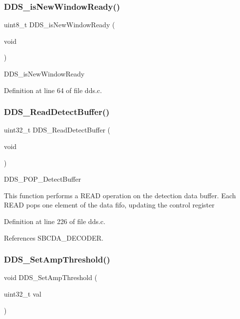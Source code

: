 \subsubsection{\texorpdfstring{D\+D\+S\+\_\+is\+New\+Window\+Ready()}{DDS\_isNewWindowReady()}}
{\footnotesize\ttfamily uint8\+\_\+t D\+D\+S\+\_\+is\+New\+Window\+Ready (\begin{DoxyParamCaption}\item[{void}]{ }\end{DoxyParamCaption})}

D\+D\+S\+\_\+is\+New\+Window\+Ready 

Definition at line 64 of file dds.\+c.

\mbox{\label{group___d_d_s___a_p_i_gabfb67b0cb69b7d443df5a21426422bbf}} 
\subsubsection{\texorpdfstring{D\+D\+S\+\_\+\+Read\+Detect\+Buffer()}{DDS\_ReadDetectBuffer()}}
{\footnotesize\ttfamily uint32\+\_\+t D\+D\+S\+\_\+\+Read\+Detect\+Buffer (\begin{DoxyParamCaption}\item[{void}]{ }\end{DoxyParamCaption})}

D\+D\+S\+\_\+\+P\+O\+P\+\_\+\+Detect\+Buffer

This function performs a R\+E\+AD operation on the detection data buffer. Each R\+E\+AD pops one element of the data fifo, updating the control register 

Definition at line 226 of file dds.\+c.



References S\+B\+C\+D\+A\+\_\+\+D\+E\+C\+O\+D\+ER.

\mbox{\label{group___d_d_s___a_p_i_gaaeb0c0549ccf4a0d5c4eb4b8733aad15}} 
\subsubsection{\texorpdfstring{D\+D\+S\+\_\+\+Set\+Amp\+Threshold()}{DDS\_SetAmpThreshold()}}
{\footnotesize\ttfamily void D\+D\+S\+\_\+\+Set\+Amp\+Threshold (\begin{DoxyParamCaption}\item[{uint32\+\_\+t}]{val }\end{DoxyParamCaption})}

